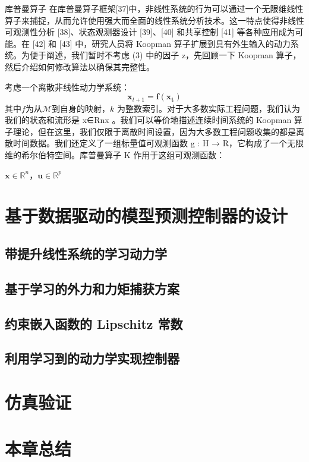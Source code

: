 \documentclass[lang=chs, degree=master, blindreview=false, winfonts=true]{yanputhesis}
\begin{document}
库普曼算子 在库普曼算子框架[37]中，非线性系统的行为可以通过一个无限维线性算子来捕捉，从而允许使用强大而全面的线性系统分析技术。这一特点使得非线性可观测性分析 [38]、状态观测器设计 [39]、[40] 和共享控制 [41] 等各种应用成为可能。在 [42] 和 [43] 中，研究人员将 Koopman 算子扩展到具有外生输入的动力系统。为便于阐述，我们暂时不考虑 (3) 中的因子 z，先回顾一下 Koopman 算子，然后介绍如何修改算法以确保其完整性。	
	
考虑一个离散非线性动力学系统：
\begin{equation}
		\bm{x}_{t+1}=\bm{f(x_t)}
\end{equation}
其中$f$为从$\mathcal{M}$到自身的映射，$k$ 为整数索引。对于大多数实际工程问题，我们认为我们的状态和流形是 x∈Rnx 。我们可以等价地描述连续时间系统的 Koopman 算子理论，但在这里，我们仅限于离散时间设置，因为大多数工程问题收集的都是离散时间数据。我们还定义了一组标量值可观测函数 g : H → R，它构成了一个无限维的希尔伯特空间。库普曼算子 K 作用于这组可观测函数：

$\bm{x}\in\mathbb{R}^n$，$\bm{u}\in\mathbb{R}^p$
	
	
\section{基于数据驱动的模型预测控制器的设计}
\subsection{带提升线性系统的学习动力学}


\subsection{基于学习的外力和力矩捕获方案}



\subsection{约束嵌入函数的 Lipschitz 常数}

\subsection{利用学习到的动力学实现控制器}


\section{仿真验证}


\section{本章总结}
\end{document}
